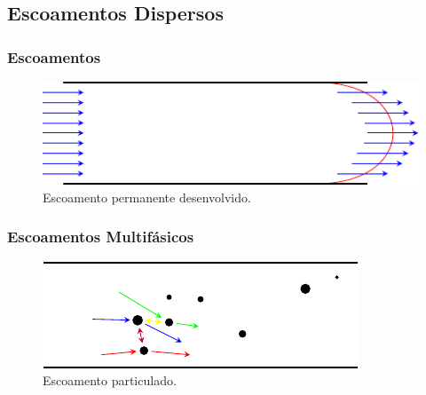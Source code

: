 \documentclass{beamer}
\newcommand{\figcopyright}[4]
{
  \begin{figure}
    \stackunder{
      \texttt{[image: \#1]}
    } {\raggedleft \tiny Fonte:\href{#2}{\textcopyright \ #3.}}
    \caption{#4}
  \end{figure}
}
\begin{document}

\subsection{Escoamentos Dispersos}
\begin{frame}
  \frametitle{Escoamentos}
  \begin{figure}
    \includegraphics[width=\linewidth]{figure/developed_flow.pdf}
    \caption{Escoamento permanente desenvolvido.}
  \end{figure}
\end{frame}

\begin{frame}
  \frametitle{Escoamentos Multifásicos}
  \begin{figure}
    \includegraphics[width=\linewidth]{figure/particle_flow.pdf}
    \caption{Escoamento particulado.}
  \end{figure}
\end{frame}

\end{document}
